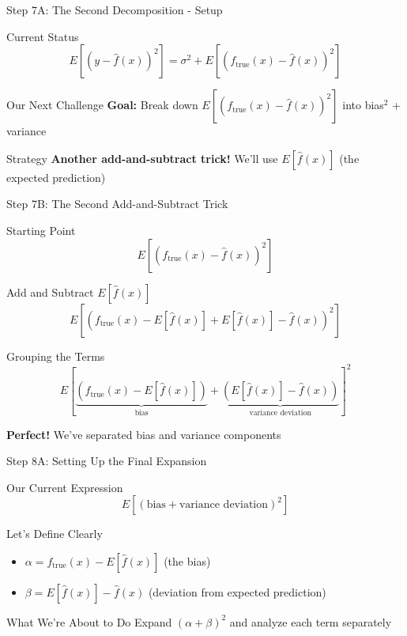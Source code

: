 \documentclass[10pt]{beamer}
\begin{document}
\begin{frame}{Step 7A: The Second Decomposition - Setup}
\begin{keypointsbox}{Current Status}
$$E[(y - \hat{f}(x))^2] = \sigma^2 + E[(f_{\text{true}}(x) - \hat{f}(x))^2]$$
\end{keypointsbox}

\begin{examplebox}{Our Next Challenge}
\textbf{Goal:} Break down $E[(f_{\text{true}}(x) - \hat{f}(x))^2]$ into bias$^2$ + variance
\end{examplebox}

\begin{keypointsbox}{Strategy}
\textbf{Another add-and-subtract trick!} We'll use $E[\hat{f}(x)]$ (the expected prediction)
\end{keypointsbox}
\end{frame}

\begin{frame}{Step 7B: The Second Add-and-Subtract Trick}
\begin{definitionbox}{Starting Point}
$$E[(f_{\text{true}}(x) - \hat{f}(x))^2]$$
\end{definitionbox}

\begin{examplebox}{Add and Subtract $E[\hat{f}(x)]$}
$$E[(f_{\text{true}}(x) - E[\hat{f}(x)] + E[\hat{f}(x)] - \hat{f}(x))^2]$$
\end{examplebox}

\begin{keypointsbox}{Grouping the Terms}
$$E[\underbrace{(f_{\text{true}}(x) - E[\hat{f}(x)])}_{\text{bias}} + \underbrace{(E[\hat{f}(x)] - \hat{f}(x))}_{\text{variance deviation}}]^2$$
\end{keypointsbox}

\begin{alertbox}
\textbf{Perfect!} We've separated bias and variance components
\end{alertbox}
\end{frame}

\begin{frame}{Step 8A: Setting Up the Final Expansion}
\begin{keypointsbox}{Our Current Expression}
$$E[(\text{bias} + \text{variance deviation})^2]$$
\end{keypointsbox}

\begin{definitionbox}{Let's Define Clearly}
\begin{itemize}
\item $\alpha = f_{\text{true}}(x) - E[\hat{f}(x)]$ (the bias)
\item $\beta = E[\hat{f}(x)] - \hat{f}(x)$ (deviation from expected prediction)
\end{itemize}
\end{definitionbox}

\begin{keypointsbox}{What We're About to Do}
Expand $(\alpha + \beta)^2$ and analyze each term separately
\end{keypointsbox}
\end{frame}
\end{document}
